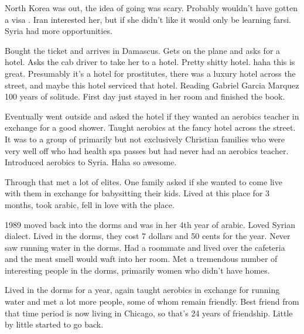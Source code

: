 \documentclass{article}
\begin{document}
North Korea was out, the idea of going was scary.  Probably wouldn't have gotten a visa . Iran interested her, but if she didn't like it would only be learning farsi.  Syria had more opportunities.  

\vspace{5mm}

Bought the ticket and arrives in Damascus.  Gets on the plane and asks for a hotel.  Asks the cab driver to take her to a hotel.  Pretty shitty hotel.  haha this is great.  Presumably it's a hotel for prostitutes, there was a luxury hotel across the street, and maybe this hotel serviced that hotel.  Reading Gabriel Garcia Marquez 100 years of solitude.  First day just stayed in her room and finished the book.  

\vspace{5mm}

Eventually went outside and asked the hotel if they wanted an aerobics teacher in exchange for a good shower.  Taught aerobics at the fancy hotel across the street.  It was to a group of primarily but not exclusively Christian families who were very well off who had health spa passes but had never had an aerobics teacher.  Introduced aerobics to Syria.  Haha so awesome.  

\vspace{5mm}

Through that met a lot of elites.  One family asked if she wanted to come live with them in exchange for babysitting their kids.  Lived at this place for 3 months, took arabic, fell in love with the place.  

\vspace{5mm}

1989 moved back into the dorms and was in her 4th year of arabic.  Loved Syrian dialect.  Lived in the dorms, they cost 7 dollars and 50 cents for the year.  Never saw running water in the dorms.  Had a roommate and lived over the cafeteria and the meat smell would waft into her room.  Met a tremendous number of interesting people in the dorms, primarily women who didn't have homes.  

\vspace{5mm}

Lived in the dorms for a year, again taught aerobics in exchange for running water and met a lot more people, some of whom remain friendly.  Best friend from that time period is now living in Chicago, so that's 24 years of friendship.  Little by little started to go back.  

\vspace{5mm}
\end{document}
